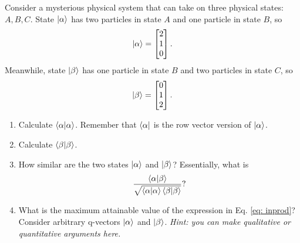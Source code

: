 \documentclass{article}
\begin{document}
    \begin{tcolorbox}[colframe=blue!50!black, arc=2mm, title=\textsc{Practice 1}]
        Consider a mysterious physical system that can take on three physical states: $A,B,C$. State $\ket{\alpha}$ has two particles in state $A$ and one particle in state $B$, so 
        \[
        \ket{\alpha} = \begin{bmatrix}
        2 \\
        1 \\
        0
        \end{bmatrix}.
        \]
        Meanwhile, state $\ket{\beta}$ has one particle in state $B$ and two particles in state $C$, so
        \[
        \ket{\beta} = \begin{bmatrix}
        0 \\
        1 \\
        2
        \end{bmatrix}.
        \]

    \end{tcolorbox}

    \begin{tcolorbox}[colframe=blue!50!black, arc=2mm, title=\textsc{Practice 1}]
        \begin{enumerate}[label=\alph*)]
        \item Calculate $\braket{\alpha}$. Remember that $\bra{\alpha}$ is the row vector version of $\ket{\alpha}$.
        \item Calculate $\braket{\beta}$.
        \item How similar are the two states $\ket{\alpha}$ and $\ket{\beta}$? Essentially, what is
        \begin{equation}
            \frac{\braket{\alpha}{\beta}}{\sqrt{\braket{\alpha}\braket{\beta}}}?
            \label{eq: inprod}
        \end{equation}
        \item What is the maximum attainable value of the expression in Eq. \ref{eq: inprod}? Consider arbitrary q-vectors $\ket{\alpha}$ and $\ket{\beta}$. \textit{Hint: you can make qualitative or quantitative arguments here.}
        \end{enumerate}
    \end{tcolorbox}
\end{document}
